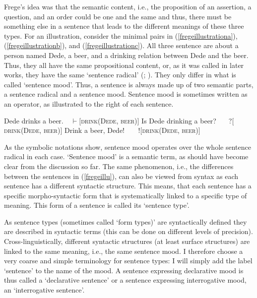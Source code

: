 \noindent Frege's idea was that the semantic content, i.e., the proposition of an assertion, a question, and an order could be one and the same and thus, there must be something else in a sentence that leads to the different meanings of these three types. For an illustration, consider the minimal pairs in (\ref{fregeillustrationa}), (\ref{fregeillustrationb}), and (\ref{fregeillustrationc}). All three sentence are about a person named Dede, a beer, and a drinking relation between Dede and the beer. Thus, they all have the same propositional content, or, as it was called in later works, they have the same `sentence radical' (\citealt[\S 22]{wittgenstein1953phil}; \citealt{stenius1967mood}). They only differ in what is called `sentence mood'. Thus, a sentence is always made up of two semantic parts, a sentence radical and a sentence mood. Sentence mood is sometimes written as an operator, as illustrated to the right of each sentence.


\begin{exe}
\ex\label{fregeillu}\begin{xlist} 
\ex Dede drinks a beer. \hfill {\textcolor{white}{!?}$\vdash$$[$\textsc{drink}(\textsc{Dede}, \textsc{beer})$]$} \label{fregeillustrationa}
\ex Is Dede drinking a beer? \hfill {\textcolor{white}{!$\vdash$}?$[$\textsc{drink}(\textsc{Dede}, \textsc{beer})$]$} \label{fregeillustrationb}
\ex Drink a beer, Dede! \hfill {\textcolor{white}{$\vdash$?}!$[$\textsc{drink}(\textsc{Dede}, \textsc{beer})$]$} \label{fregeillustrationc}
\end{xlist}
\end{exe} 

\noindent As the symbolic notations show, sentence mood operates over the whole sentence radical in each case. `Sentence mood' is a semantic term, as should have become clear from the discussion so far. The same phenomenon, i.e., the differences between the sentences in (\ref{fregeillu}), can also be viewed from syntax as each sentence has a different syntactic structure. This means, that each sentence has a specific morpho-syntactic form that is systematically linked to a specific type of meaning. This form of a sentence is called its `sentence type'. 

As sentence types (sometimes called `form types)' are syntactically defined they are described in syntactic terms (this can be done on different levels of precision). Cross-linguistically, different syntactic structures (at least surface structures) are linked to the same meaning, i.e., the same sentence mood. I therefore choose a very coarse and simple terminology for sentence types: I will simply add the label `sentence' to the name of the mood. A sentence expressing declarative mood is thus called a `declarative sentence' or a sentence expressing interrogative mood, an `interrogative sentence'.

